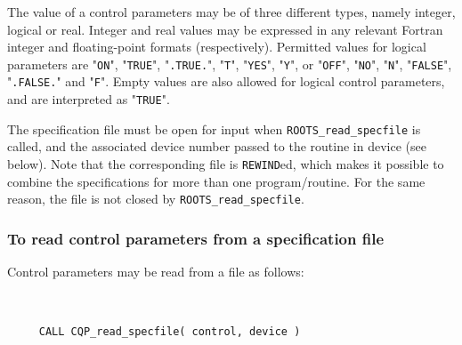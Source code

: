 \documentclass{galahad}
\newcommand{\packagename}{ROOTS}
\begin{document}
The value of a control parameters may be of three different types, namely
integer, logical or real.
Integer and real values may be expressed in any relevant Fortran integer and
floating-point formats (respectively). Permitted values for logical
parameters are "{\tt ON}", "{\tt TRUE}", "{\tt .TRUE.}", "{\tt T}", 
"{\tt YES}", "{\tt Y}", or "{\tt OFF}", "{\tt NO}",
"{\tt N}", "{\tt FALSE}", "{\tt .FALSE.}" and "{\tt F}". 
Empty values are also allowed for 
logical control parameters, and are interpreted as "{\tt TRUE}".  

The specification file must be open for 
input when {\tt \packagename\_read\_specfile}
is called, and the associated device number 
passed to the routine in device (see below). 
Note that the corresponding 
file is {\tt REWIND}ed, which makes it possible to combine the specifications 
for more than one program/routine.  For the same reason, the file is not
closed by {\tt \packagename\_read\_specfile}.

\subsubsection{To read control parameters from a specification file}
\label{readspec}

Control parameters may be read from a file as follows:
\hskip0.5in 

\def\baselinestretch{0.8}
{\tt 
\begin{verbatim}
     CALL CQP_read_specfile( control, device )
\end{verbatim}
}
\def\baselinestretch{1.0}
\end{document}
